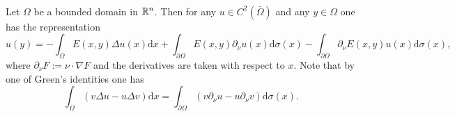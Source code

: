 \documentclass[11pt]{article}
\begin{document}
				\begin{thm}\label{thm--potentials}\phantom{k}\\
					Let $\Omega$ be a bounded domain in $\mathbb{R}^n$. Then for any $u\in C^2(\bar{\Omega})$ and any $y\in\Omega$ one has the representation
					\begin{equation*}
						u(y)=-\int_\Omega E(x,y)\Delta u(x)\mathrm{d}x+\int_{\partial\Omega}E(x,y)\partial_\nu u(x)\mathrm{d}\sigma(x)-\int_{\partial\Omega}\partial_\nu E(x,y)u(x)\mathrm{d}\sigma(x),
					\end{equation*}
					where $\partial_\nu F:=\nu\cdot\nabla F$ and the derivatives are taken with respect to $x$. Note that by one of Green's identities one has
					\begin{equation*}
						\int_\Omega(v\Delta u-u\Delta v)\mathrm{d}x=\int_{\partial\Omega}(v\partial_\nu u-u\partial_\nu v)\mathrm{d}\sigma(x).
					\end{equation*}
				\end{thm}
\end{document}
